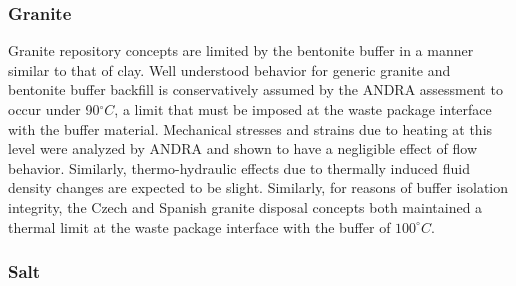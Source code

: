 
% 


\subsubsection{Granite}

Granite repository concepts are limited by the bentonite buffer in a manner 
similar to that of clay. 
Well understood behavior for generic granite and bentonite buffer backfill
is conservatively assumed by the \gls{ANDRA} assessment to occur under 
90$^\circ C$, a limit that must be imposed at the waste package interface with 
the buffer material.  Mechanical stresses and strains due to heating at this 
level were analyzed by \gls{ANDRA} and shown to have a negligible effect of 
flow behavior. Similarly, thermo-hydraulic effects due to thermally induced 
fluid density changes are expected to be slight. \cite{andra_argile:_2005}
Similarly, for reasons of buffer isolation integrity, the Czech and Spanish
granite disposal concepts both maintained a thermal limit at the waste package
interface with the buffer of $100^\circ C$.  \cite{von_lensa_red-impact_2008}

\subsubsection{Salt} 

